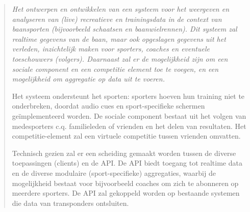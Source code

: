 \begin{quotation}
\itshape
Het ontwerpen en ontwikkelen van een systeem voor het weergeven en analyseren van (live) recreatieve en trainingsdata in de context van baansporten (bijvoorbeeld schaatsen en baanwielrennen). Dit systeem zal realtime gegevens van de baan, maar ook opgeslagen gegevens uit het verleden, inzichtelijk maken voor sporters, coaches en eventuele toeschouwers (volgers). Daarnaast zal er de mogelijkheid zijn om een sociale component en een competitie element toe te voegen, en een mogelijkheid om aggregatie op data uit te voeren.

Het systeem ondersteunt het sporten: sporters hoeven hun training niet te onderbreken, doordat audio cues en sport-specifieke schermen geïmplementeerd worden. De sociale component bestaat uit het volgen van medesporters c.q. familieleden of vrienden en het delen van resultaten. Het competitie-element zal een virtuele competitie tussen vrienden omvatten.

Technisch gezien zal er een scheiding gemaakt worden tussen de diverse toepassingen (clients) en de API. De API biedt toegang tot realtime data en de diverse modulaire (sport-specifieke) aggregaties, waarbij de mogelijkheid bestaat voor bijvoorbeeld coaches om zich te abonneren op meerdere sporters. De API zal gekoppeld worden op bestaande systemen die data van transponders ontsluiten.
\end{quotation}
